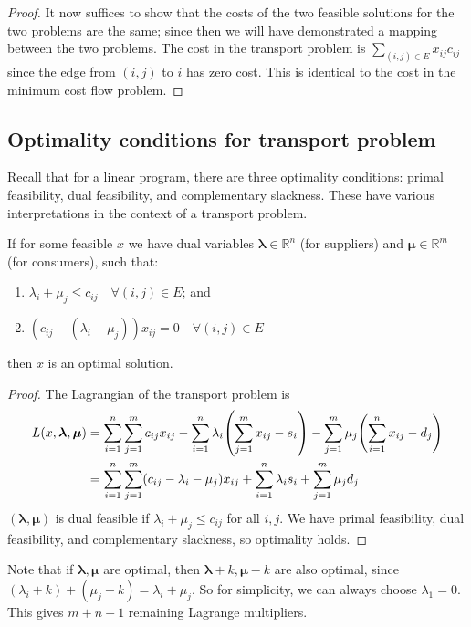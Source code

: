 \begin{proof}
	\medskip\noindent It now suffices to show that the costs of the two feasible solutions for the two problems are the same; since then we will have demonstrated a mapping between the two problems.
	The cost in the transport problem is \( \sum_{(i,j) \in E} x_{ij} c_{ij} \) since the edge from \( (i,j) \) to \( i \) has zero cost.
	This is identical to the cost in the minimum cost flow problem.
\end{proof}

\subsection{Optimality conditions for transport problem}
Recall that for a linear program, there are three optimality conditions: primal feasibility, dual feasibility, and complementary slackness.
These have various interpretations in the context of a transport problem.
\begin{theorem}
	If for some feasible \( x \) we have dual variables \( \bm \lambda \in \mathbb R^n \) (for suppliers) and \( \bm \mu \in \mathbb R^m \) (for consumers), such that:
	\begin{enumerate}
		\item \( \lambda_i + \mu_j \leq c_{ij} \quad \forall (i,j) \in E \); and
		\item \( (c_{ij} - (\lambda_i + \mu_j)) x_{ij} = 0 \quad \forall (i,j) \in E \)
	\end{enumerate}
	then \( x \) is an optimal solution.
\end{theorem}
\begin{proof}
	The Lagrangian of the transport problem is
	\begin{align*}
		L(x,\bm \lambda,\bm \mu) & = \sum_{i=1}^n \sum_{j=1}^m c_{ij}x_{ij} - \sum_{i=1}^n \lambda_i \qty(\sum_{j=1}^m x_{ij} - s_i) - \sum_{j=1}^m \mu_j \qty(\sum_{i=1}^n x_{ij} - d_j) \\
		                         & = \sum_{i=1}^n \sum_{j=1}^m (c_{ij} - \lambda_i - \mu_j) x_{ij} + \sum_{i=1}^n \lambda_i s_i + \sum_{j=1}^m \mu_j d_j
	\end{align*}
	\( (\bm \lambda, \bm \mu) \) is dual feasible if \( \lambda_i + \mu_j \leq c_{ij} \) for all \( i,j \).
	We have primal feasibility, dual feasibility, and complementary slackness, so optimality holds.
\end{proof}
Note that if \( \bm\lambda, \bm\mu \) are optimal, then \( \bm\lambda + k, \bm\mu - k \) are also optimal, since \( (\lambda_i + k) + (\mu_j - k) = \lambda_i + \mu_j \).
So for simplicity, we can always choose \( \lambda_1 = 0 \).
This gives \( m + n - 1 \) remaining Lagrange multipliers.
